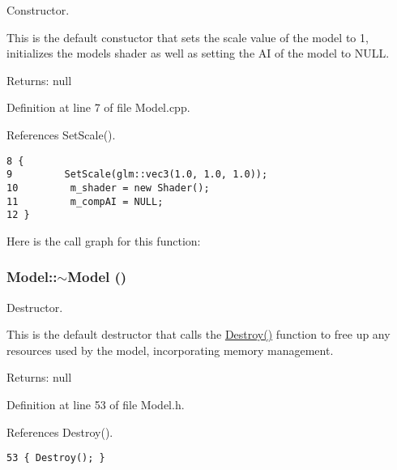 Constructor. 

This is the default constuctor that sets the scale value of the model to 1, initializes the models shader as well as setting the AI of the model to NULL.

\begin{Desc}
\item[Returns:]null \end{Desc}


Definition at line 7 of file Model.cpp.

References SetScale().

\begin{Code}\begin{verbatim}8 {
9         SetScale(glm::vec3(1.0, 1.0, 1.0));
10         m_shader = new Shader();
11         m_compAI = NULL;
12 }
\end{verbatim}
\end{Code}




Here is the call graph for this function:\hypertarget{class_model_d6ebd2062a0b823db841a0b88baac4c0}{
\subsubsection[$\sim$Model]{\setlength{\rightskip}{0pt plus 5cm}Model::$\sim$Model ()}}
\label{class_model_d6ebd2062a0b823db841a0b88baac4c0}


Destructor. 

This is the default destructor that calls the \hyperlink{class_model_d60ed0ed7eaa7dcdd58398e6efacc7c4}{Destroy()} function to free up any resources used by the model, incorporating memory management.

\begin{Desc}
\item[Returns:]null \end{Desc}


Definition at line 53 of file Model.h.

References Destroy().

\begin{Code}\begin{verbatim}53 { Destroy(); }
\end{verbatim}
\end{Code}




